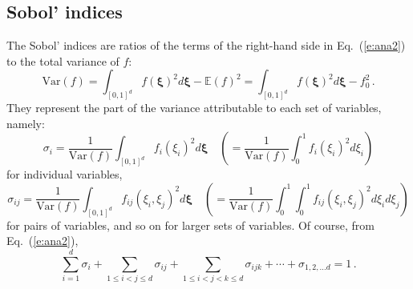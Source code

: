 \documentclass{eurosae}
\def\beq{\begin{equation}}
\def\eeq{\end{equation}}
\newcommand{\xigj}{\xi}
\newcommand{\xig}{{\boldsymbol\xi}}
\newcommand{\esp}{{\mathbb E}}
\newcommand{\var}{\text{Var}}
\newcommand{\eref}[1]{Eq.~(\ref{#1})}
\begin{document}
\subsection{Sobol' indices}
%
The Sobol' indices are ratios of the terms of the right-hand side in \eref{e:ana2} to the total variance of $f$:
%
   $$ \var(f) =  \int_{[0,1]^d} f(\xig)^2 d\xig - \esp(f) ^2 = \int_{[0,1]^d} f(\xig)^2 d\xig - f_0 ^2\,.  $$
%
They represent the part of the variance attributable to each set of variables, namely:
%
\beq\label{e:sobol1}
 \sigma_i = \frac{1}{\var(f)} \int_{[0,1]^d} f_i(\xigj_i)^2 d\xig\quad\left(=\frac{1}{\var(f)} \int_0^1 f_i(\xigj_i)^2 d\xigj_i\right) 
\eeq
%
for individual variables,
%
\beq\label{e:sobol2}
\sigma_{ij} = \frac{1}{\var(f)}  \int_{[0,1]^d} f_{ij}(\xigj_i,\xigj_j)^2 d\xig\quad\left(=\frac{1}{\var(f)}\int_0^1\int_0^1 f_{ij}(\xigj_i,\xigj_j)^2 d\xigj_i d\xigj_j \right) 
\eeq
%
for pairs of variables, and so on for larger sets of variables. Of course, from \eref{e:ana2},
%
 $$    \sum_{i=1}^d \sigma_i + \sum_{1\leq i<j\leq d} \sigma_{ij}  + \sum_{1\leq i<j<k\leq d} \sigma_{ijk} + \cdots +  \sigma_{1,2,\dots d} = 1\,. $$
%
%
\end{document}
